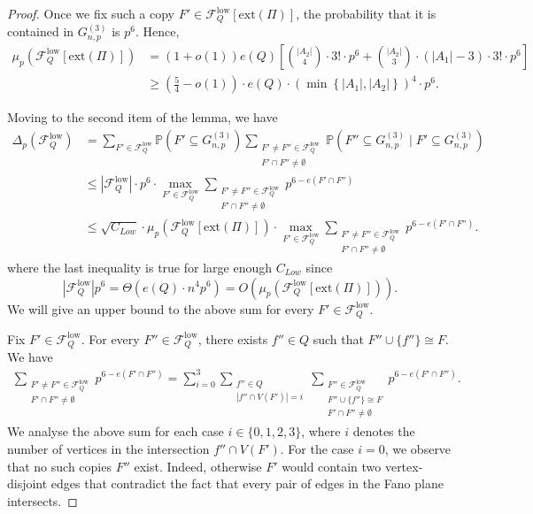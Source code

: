 \documentclass[11pt,a4paper,oneside,reqno]{amsart}
\newcommand{\Gnp}{G_{n, p}^{(3)}}
\newcommand{\cF}{\mathcal{F}}
\renewcommand{\Pr}{\mathbb{P}}
\newcommand{\1}{\mathbbm{1}} %
\renewcommand{\le}{\leqslant}
\renewcommand{\ge}{\geqslant}
\newcommand{\cFQL}{\cF_Q^{\mathrm{low}}}
\newcommand{\ext}{\mathrm{ext}}
\begin{document}
\begin{proof}
    Once we fix such a copy $F' \in \cFQL[\ext(\Pi)]$, the probability that it is contained in $\Gnp$ is $p^6$.   
    Hence,
    \begin{align*}
        \mu_p\left(\cFQL[\ext(\Pi)]\right) &= (1+o(1)) e(Q) \left[\binom{|A_2|}{4} \cdot 3! \cdot p^6 + \binom{|A_2|}{3} \cdot (|A_1| - 3) \cdot 3! \cdot p^6\right] \\
        &\ge \left(\frac{5}{4} - o(1)\right) \cdot e(Q) \cdot \left(\min\left\{|A_1|, |A_2|\right\}\right)^{4} \cdot p^6.
    \end{align*}    

    Moving to the second item of the lemma, we have
    \begin{align*}
        \Delta_p\left(\cFQL\right) &= \sum_{F' \in \cFQL} \Pr\left(F' \subseteq \Gnp\right) \sum_{\substack{F' \neq F'' \in \cFQL \\ F' \cap F'' \neq \emptyset}} \Pr\left(F'' \subseteq \Gnp \mid F' \subseteq \Gnp\right) \\
        &\le \left|\cFQL\right| \cdot p^{6} \cdot \max_{F' \in \cFQL} \sum_{\substack{F' \neq F'' \in \cFQL \\ F' \cap F'' \neq \emptyset}} p^{6 - e(F' \cap F'')}\\
        &\le \sqrt{C_{Low}} \cdot \mu_p\left(\cFQL[\ext(\Pi)]\right) \cdot \max_{F' \in \cFQL} \sum_{\substack{F' \neq F'' \in \cFQL \\ F' \cap F'' \neq \emptyset}} p^{6 - e(F' \cap F'')}.
    \end{align*}
    where the last inequality is true for large enough $C_{Low}$ since 
    \[
        \left|\cFQL\right| p^{6} = \Theta\left(e(Q) \cdot n^{4} p^{6}\right) = O\left(\mu_p\left(\cFQL[\ext(\Pi)]\right)\right).
    \]
    We will give an upper bound to the above sum for every $F' \in \cFQL$.    

    Fix $F' \in \cFQL$. For every $F'' \in \cFQL$, there exists $f'' \in Q$ such that $F'' \cup \{f''\} \cong F$. We have
    \begin{align}\label{align:sum-of-low-delta}
        \sum_{\substack{F' \neq F'' \in \cFQL \\ F' \cap F'' \neq \emptyset}} p^{6 - e(F' \cap F'')} = 
        \sum_{i=0}^{3} \sum_{\substack{f'' \in Q \\ |f'' \cap V(F')| = i}} \sum_{\substack{F'' \in \cFQL \\ F'' \cup \{f''\} \cong F \\ F' \cap F'' \neq \emptyset}} p^{6 - e(F' \cap F'')}.
    \end{align}
    We analyse the above sum for each case $i \in \{0, 1, 2, 3\}$, where $i$ denotes the number of vertices in the intersection $f'' \cap V(F')$. For the case $i=0$, we observe that no such copies $F''$ exist. Indeed, otherwise $F'$ would contain two vertex-disjoint edges that contradict the fact that every pair of edges in the Fano plane intersects.


\end{proof}
\end{document}
